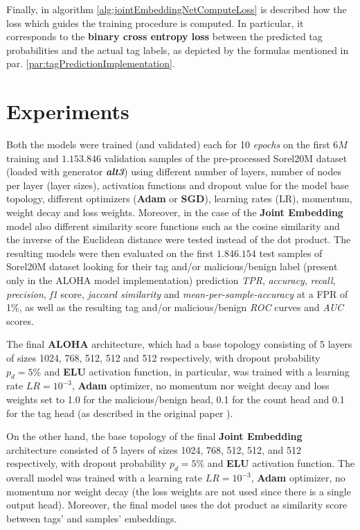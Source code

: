 \documentclass[pdfa%
,cucitura%
]{toptesi}
\begin{document}
Finally, in algorithm \ref{alg:jointEmbeddingNetComputeLoss} is described how the loss which guides the training procedure is computed. In particular, it corresponds to the \textbf{binary cross entropy loss} between the predicted tag probabilities and the actual tag labels, as depicted by the formulas mentioned in par. \ref{par:tagPredictionImplementation}.

\section{Experiments}
Both the models were trained (and validated) each for 10 \textit{epochs} on the first $6M$ training and $1.153.846$ validation samples of the pre-processed Sorel20M dataset (loaded with generator \textit{\textbf{alt3}}) using different number of layers, number of nodes per layer (layer sizes), activation functions and dropout value for the model base topology, different optimizers (\textbf{Adam} or \textbf{SGD}), learning rates (LR), momentum, weight decay and loss weights. Moreover, in the case of the \textbf{Joint Embedding} model also different similarity score functions such as the cosine similarity and the inverse of the Euclidean distance were tested instead of the dot product. The resulting models were then evaluated on the first $1.846.154$ test samples of Sorel20M dataset looking for their tag and/or malicious/benign label (present only in the ALOHA model implementation) prediction \textit{TPR}, \textit{accuracy}, \textit{recall}, \textit{precision}, \textit{f1} score, \textit{jaccard similarity} and \textit{mean-per-sample-accuracy} at a FPR of 1\%, as well as the resulting tag and/or malicious/benign \textit{ROC} curves and \textit{AUC} scores.

The final \textbf{ALOHA} architecture, which had a base topology consisting of 5 layers of sizes 1024, 768, 512, 512 and 512 respectively, with dropout probability $p_d=5\%$ and \textbf{ELU} activation function, in particular, was trained with a learning rate $LR = 10^{-3}$, \textbf{Adam} optimizer, no momentum nor weight decay and loss weights set to 1.0 for the malicious/benign head, 0.1 for the count head and 0.1 for the tag head (as described in the original paper \cite{ruddALOHA}).

On the other hand, the base topology of the final \textbf{Joint Embedding} architecture consisted of 5 layers of sizes 1024, 768, 512, 512, and 512 respectively, with dropout probability $p_d=5\%$ and \textbf{ELU} activation function. The overall model was trained with a learning rate $LR = 10^{-3}$, \textbf{Adam} optimizer, no momentum nor weight decay (the loss weights are not used since there is a single output head). Moreover, the final model uses the dot product as similarity score between tags' and samples' embeddings.
\end{document}
